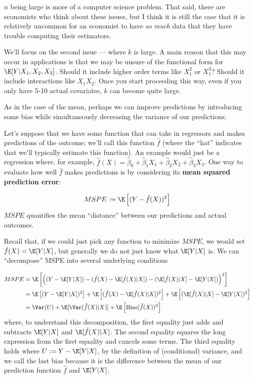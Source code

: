 \documentclass[
  letterpaper,
  DIV=11,
  numbers=noendperiod]{scrreprt}
\begin{document}
\(n\) being large is more of a computer science problem. That said,
there are economists who think about these issues, but I think it is
still the case that it is relatively uncommon for an economist to have
\emph{so much} data that they have trouble computing their estimators.

We'll focus on the second issue --- where \(k\) is large. A main reason
that this may occur in applications is that we may be unsure of the
functional form for \(\E[Y|X_1,X_2,X_3]\). Should it include higher
order terms like \(X_1^2\) or \(X_1^3\)? Should it include interactions
like \(X_1 X_2\). Once you start proceeding this way, even if you only
have 5-10 actual covariates, \(k\) can become quite large.

As in the case of the mean, perhaps we can improve predictions by
introducing some bias while simultaneously decreasing the variance of
our predictions.

Let's suppose that we have some function that can take in regressors and
makes predictions of the outcome; we'll call this function \(\hat{f}\)
(where the ``hat'' indicates that we'll typically estimate this
function). An example would just be a regression where, for example,
\(\hat{f}(X) = \hat{\beta}_0 + \hat{\beta}_1 X_1 + \hat{\beta}_2 X_2 + \hat{\beta}_3 X_3\).
One way to evaluate how well \(\hat{f}\) makes predictions is by
considering its \textbf{mean squared prediction error}:

\[
  MSPE := \E\left[ (Y - \hat{f}(X))^2 \right]
\] \(MSPE\) quantifies the mean ``distance'' between our predictions and
actual outcomes.

Recall that, if we could just pick any function to minimize \(MSPE\), we
would set \(\hat{f}(X) = \E[Y|X]\), but generally we do not just know
what \(\E[Y|X]\) is. We can ``decompose'' MSPE into several underlying
conditions

\[
  \begin{aligned}
  MSPE &= \E\left[ \left( (Y - \E[Y|X]) - (\hat{f}(X) - \E[\hat{f}(X)|X]) - (\E[\hat{f}(X)|X] - \E[Y|X]) \right)^2 \right] \\
  &= \E\left[ (Y-\E[Y|X])^2 \right] + \E\left[ (\hat{f}(X) - \E[\hat{f}(X)|X])^2\right] + \E\left[ (\E[\hat{f}(X)|X] - \E[Y|X])^2 \right] \\
  &= \Var(U) + \E[\Var(\hat{f}(X)|X)] + \E\left[\textrm{Bias}(\hat{f}(X))^2\right]
  \end{aligned}
\] where, to understand this decomposition, the first equality just adds
and subtracts \(\E[Y|X]\) and \(\E[\hat{f}(X)|X]\). The second equality
squares the long expression from the first equality and cancels some
terms. The third equality holds where \(U := Y-\E[Y|X]\), by the
definition of (conditional) variance, and we call the last bias because
it is the difference between the mean of our prediction function
\(\hat{f}\) and \(\E[Y|X]\).
\end{document}

